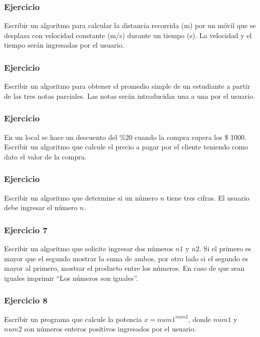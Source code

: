 \pagebreak
\subsubsection{Ejercicio}
Escribir un algoritmo para calcular la distancia recorrida (m) por un móvil que se desplaza con velocidad constante (m/s) durante un tiempo (s). 
La velocidad y el tiempo serán ingresadas por el usuario.

\subsubsection{Ejercicio}
Escribir un algoritmo para obtener el promedio simple de un estudiante a partir de las tres notas parciales.
Las notas serán introducidas una a una por el usuario.

\subsubsection{Ejercicio}
En un local se hace un descuento del \%20 cuando la compra supera los \$ 1000. Escribir un algoritmo que calcule el precio a pagar por el cliente
teniendo como dato el valor de la compra.

\subsubsection{Ejercicio}
Escribir un algoritmo que determine si un número $n$ tiene tres cifras. El usuario debe ingresar el número $n$.

\subsubsection{Ejercicio 7}
Escribir un algoritmo que solicite ingresar dos números $n1$ y $n2$. Si el primero es mayor que el segundo mostrar la suma de ambos, por otro lado si el segundo es mayor al primero, mostrar el producto entre los números. En caso de que sean iguales imprimir ``Los números son iguales''.

\subsubsection{Ejercicio 8}
Escribir un programa que calcule la potencia $x={num1}^{num2}$, donde $num1$ y $num2$ son números enteros positivos ingresados por el usuario.

